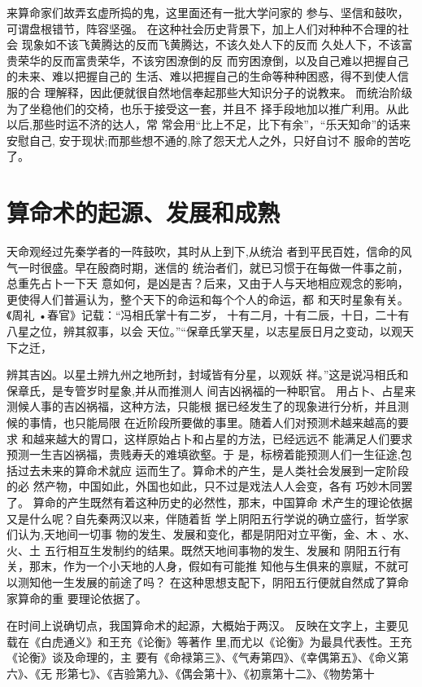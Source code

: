 来算命家们故弄玄虚所捣的鬼，这里面还有一批大学问家的
参与、坚信和鼓吹，可谓盘根错节，阵容坚强。
在这种社会历史背景下，加上人们对种种不合理的社会
现象如不该飞黄腾达的反而飞黄腾达，不该久处人下的反而
久处人下，不该富贵荣华的反而富贵荣华，不该穷困潦倒的反
而穷困潦倒，以及自己难以把握自己的未来、难以把握自己的
生活、难以把握自己的生命等种种困惑，得不到使人信服的合
理解释，因此便就很自然地信奉起那些大知识分子的说教来。
而统治阶级为了坐稳他们的交椅，也乐于接受这一套，并且不
择手段地加以推广利用。从此以后,那些时运不济的达人，常
常会用“比上不足，比下有余”，“乐天知命”的话来安慰自己,
安于现状;而那些想不通的,除了怨天尤人之外，只好自讨不
服命的苦吃了。

\section{算命术的起源、发展和成熟}
天命观经过先秦学者的一阵鼓吹，其时从上到下,从统治
者到平民百姓，信命的风气一时很盛。早在殷商时期，迷信的
统治者们，就已习惯于在每做一件事之前，总重先占卜一下天
意如何，是凶是吉？后来，又由于人与天地相应观念的影响，
更使得人们普遍认为，整个天下的命运和每个个人的命运，都
和天时星象有关。《周礼 •春官》记载：“冯相氏掌十有二岁，
十有二月，十有二辰，十日，二十有八星之位，辨其叙事，以会
天位。”“保章氏掌天星，以志星辰日月之变动，以观天下之迁，

辨其吉凶。以星土辨九州之地所封，封域皆有分星，以观妖
祥。”这是说冯相氏和保章氏，是专管岁时星象,并从而推测人
间吉凶祸福的一种职官。
用占卜、占星来测候人事的吉凶祸福，这种方法，只能根
据已经发生了的现象进行分析，并且测候的事情，也只能局限
在近阶段所要做的事里。随着人们对预测术越来越高的要求
和越来越大的胃口，这样原始占卜和占星的方法，已经远远不
能满足人们要求预测一生吉凶祸福，贵贱寿夭的难填欲壑。于
是，标榜着能预测人们一生征途,包括过去未来的算命术就应
运而生了。算命术的产生，是人类社会发展到一定阶段的必
然产物，中国如此，外国也如此，只不过是戏法人人会变，各有
巧妙木同罢了。
算命的产生既然有着这种历史的必然性，那末，中国算命
术产生的理论依据又是什么呢？自先秦两汉以来，伴随着哲
学上阴阳五行学说的确立盛行，哲学家们认为,天地间一切事
物的发生、发展和变化，都是阴阳对立平衡，金、木 、水、火、土
五行相互生发制约的结果。既然天地间事物的发生、发展和
阴阳五行有关，那末，作为一个小天地的人身，假如有可能推
知他与生俱来的禀赋，不就可以测知他一生发展的前途了吗？
在这种思想支配下，阴阳五行便就自然成了算命家算命的重
要理论依据了。

在时间上说确切点，我国算命术的起源，大概始于两汉。
反映在文字上，主要见载在《白虎通义》和王充《论衡》等著作
里,而尤以《论衡》为最具代表性。王充《论衡》谈及命理的，主
要有《命禄第三》、《气寿第四》、《幸偶第五》、《命义第六》、《无
形第七》、《吉验第九》、《偶会第十》、《初禀第十二》、《物势第十

